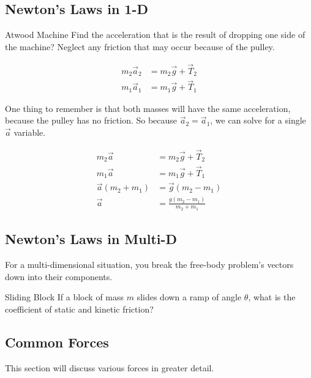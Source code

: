 \subsection{Newton's Laws in 1-D} \label{subsec:Newtons Laws 1-D}
\begin{example}[]{Atwood Machine}
  Find the acceleration that is the result of dropping one side of the machine?
  Neglect any friction that may occur because of the pulley.

  \tcblower

  \begin{align*}
    m_{2} \vec{a}_{2} &= m_{2} \vec{g} + \vec{T}_{2} \\
    m_{1} \vec{a}_{1} &= m_{1} \vec{g} + \vec{T}_{1}
  \end{align*}

  One thing to remember is that both masses will have the same acceleration, because the pulley has no friction.
  So because $\vec{a}_{2} = \vec{a}_{1}$, we can solve for a single $\vec{a}$ variable.

  \begin{align*}
    m_{2} \vec{a} &= m_{2} \vec{g} + \vec{T}_{2} \\
    m_{1} \vec{a} &= m_{1} \vec{g} + \vec{T}_{1} \\
    \vec{a} \left( m_{2} + m_{1} \right) &= \vec{g} \left( m_{2} - m_{1} \right) \\
    \vec{a} &= \frac{g \left( m_{2} - m_{1} \right)}{m_{2}+m_{1}}
  \end{align*}
\end{example}

\subsection{Newton's Laws in Multi-D} \label{subsec:Newtons Laws Multi-D}
For a multi-dimensional situation, you break the free-body problem's vectors down into their components.

\begin{example}[]{Sliding Block}
  If a block of mass $m$ slides down a ramp of angle $\theta$, what is the coefficient of static and kinetic friction?

  \tcblower

\end{example}

\subsection{Common Forces} \label{subsec:Common Forces}
This section will discuss various forces in greater detail.

